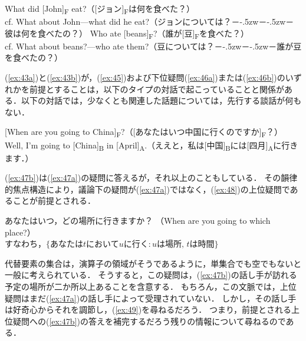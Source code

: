 \documentclass{goken}
\def\ddash{－\kern-.5zw－\kern-.5zw－}
\begin{document}
\begin{exe}
	\ex\label{ex:46}
  \begin{xlist}
    \ex\label{ex:46a}
    What did [John]\textsubscript{F} eat?（[ジョン]\textsubscript{F}は何を食べた？）\\
    cf. What about John---what did he eat?（ジョンについては？\ddash{}彼は何を食べたの？）
    \ex\label{ex:46b}
    Who ate [beans]\textsubscript{F}?（誰が[豆]\textsubscript{F}を食べた？）\\
    cf. What about beans?---who ate them?（豆については？\ddash{}誰が豆を食べたの？）
  \end{xlist}
\end{exe}

\noindent
(\ref{ex:43a})と(\ref{ex:43b})が，(\ref{ex:45})および下位疑問(\ref{ex:46a})または(\ref{ex:46b})のいずれかを前提とすることは，以下のタイプの対話で起こっていることと関係がある．以下の対話では，少なくとも関連した話題については，先行する談話が何もない．

\begin{exe}
	\ex\label{ex:47}
  \begin{xlist}
    \ex\label{ex:47a}
    [When are you going to China]\textsubscript{F}?（[あなたはいつ中国に行くのですか]\textsubscript{F}？）
    \ex\label{ex:47b}
    Well, I'm going to [China]\textsubscript{B} in [April]\textsubscript{A}.（ええと，私は[中国]\textsubscript{B}には[四月]\textsubscript{A}に行きます．）
  \end{xlist}
\end{exe}

\noindent
(\ref{ex:47b})は(\ref{ex:47a})の疑問に答えるが，それ以上のこともしている．
その韻律的焦点構造により，議論下の疑問が(\ref{ex:47a})ではなく，(\ref{ex:48})の上位疑問であることが前提とされる．

\begin{exe}
	\ex\label{ex:48}
  あなたはいつ，どの場所に行きますか？ （When are you going to which place?）\\
  すなわち，$\{\text{あなたは} t \text{において} u \text{に行く}: u \text{は場所},\, t\text{は時間}\}$
\end{exe}

\noindent
代替要素の集合は，演算子の領域がそうであるように，単集合でも空でもないと一般に考えられている．
そうすると，この疑問は，(\ref{ex:47b})の話し手が訪れる予定の場所が二か所以上あることを含意する．
もちろん，この文脈では，上位疑問はまだ(\ref{ex:47a})の話し手によって受理されていない．
しかし，その話し手は好奇心からそれを調節し，(\ref{ex:49})を尋ねるだろう．
つまり，前提とされる上位疑問への(\ref{ex:47b})の答えを補完するだろう残りの情報について尋ねるのである．
\end{document}
